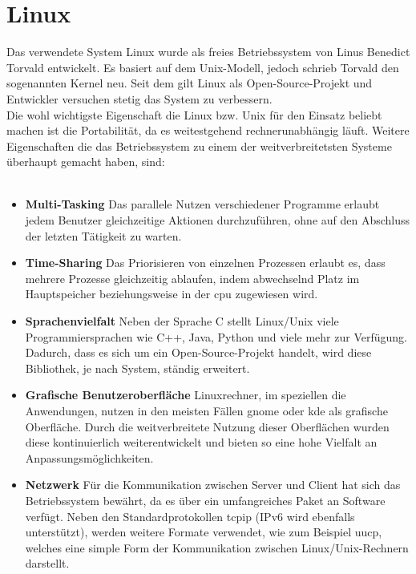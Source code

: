 \section{Linux}\label{kap:linux}


Das verwendete System Linux wurde als freies Betriebssystem von Linus Benedict Torvald entwickelt.
Es basiert auf dem Unix-Modell, jedoch schrieb Torvald den sogenannten Kernel neu. Seit dem gilt
Linux als Open-Source-Projekt und Entwickler versuchen stetig das System zu verbessern.\cite{linux}\\
Die wohl wichtigste Eigenschaft die Linux bzw. Unix für den Einsatz beliebt machen ist die Portabilität,
da es weitestgehend rechnerunabhängig läuft. Weitere Eigenschaften die das Betriebssystem zu einem der
 weitverbreitetsten Systeme überhaupt gemacht haben, sind:\\\cite{linux}\\
\begin{itemize}
\item  \textbf{Multi-Tasking} Das parallele Nutzen verschiedener Programme erlaubt jedem Benutzer
        gleichzeitige Aktionen durchzuführen, ohne auf den Abschluss der letzten Tätigkeit zu warten.
\item  \textbf{Time-Sharing} Das Priorisieren von einzelnen Prozessen erlaubt es, dass mehrere
        Prozesse gleichzeitig ablaufen, indem abwechselnd Platz im Hauptspeicher beziehungsweise in der \ac{cpu}
        zugewiesen wird.
\item \textbf{Sprachenvielfalt} Neben der Sprache C stellt Linux/Unix viele Programmiersprachen
      wie C++, Java, Python und viele mehr zur Verfügung. Dadurch, dass es sich um ein Open-Source-Projekt handelt,
      wird diese Bibliothek, je nach System, ständig erweitert.
\item \textbf{Grafische Benutzeroberfläche} Linuxrechner, im speziellen die Anwendungen, nutzen in
      den meisten Fällen \ac{gnome} oder \ac{kde} als grafische Oberfläche. Durch die weitverbreitete Nutzung
      dieser Oberflächen wurden diese kontinuierlich weiterentwickelt und bieten so eine hohe Vielfalt an
      Anpassungsmöglichkeiten.
\item \textbf{Netzwerk} Für die Kommunikation zwischen Server und Client hat sich das Betriebssystem bewährt,
      da es über ein umfangreiches Paket an Software verfügt. Neben den Standardprotokollen \ac{tcpip} (IPv6 wird
      ebenfalls unterstützt), werden weitere Formate verwendet, wie zum Beispiel \ac{uucp}, welches eine simple Form
      der Kommunikation zwischen Linux/Unix-Rechnern darstellt.
\end{itemize}

